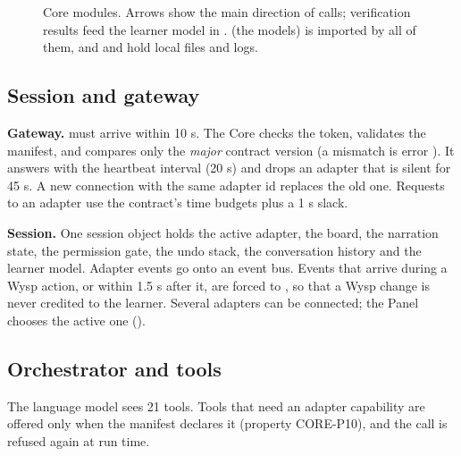 \begin{figure}[H]
\caption{Core modules. Arrows show the main direction of calls; verification results feed the learner model in .  (the models) is imported by all of them, and  and  hold local files and logs.}\label{fig:coremap}
\end{figure}

\subsection{Session and gateway}

\textbf{Gateway.}  must arrive within 10 s. The Core checks the token, validates the manifest, and compares only the \emph{major} contract version (a mismatch is error ). It answers with the heartbeat interval (20 s) and drops an adapter that is silent for 45 s. A new connection with the same adapter id replaces the old one. Requests to an adapter use the contract's time budgets plus a 1 s slack.

\textbf{Session.} One session object holds the active adapter, the board, the narration state, the permission gate, the undo stack, the conversation history and the learner model. Adapter events go onto an event bus. Events that arrive during a Wysp action, or within 1.5 s after it, are forced to , so that a Wysp change is never credited to the learner. Several adapters can be connected; the Panel chooses the active one ().

\subsection{Orchestrator and tools}

The language model sees 21 tools. Tools that need an adapter capability are offered only when the manifest declares it (property CORE-P10), and the call is refused again at run time.

